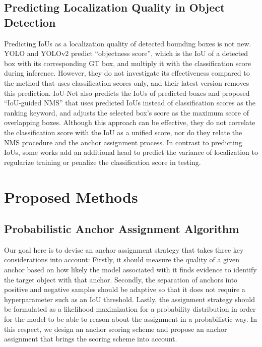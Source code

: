 \documentclass[runningheads]{llncs}
\begin{document}
\subsection{Predicting Localization Quality in Object Detection}
Predicting IoUs as a localization quality of detected bounding boxes is not new. YOLO and YOLOv2\cite{yolo, yolo2} predict ``objectness score'', which is the IoU of a detected box with its corresponding GT box, and multiply it with the classification score during inference. However, they do not investigate its effectiveness compared to the method that uses classification scores only, and their latest version \cite{yolov3} removes this prediction. IoU-Net\cite{iounet} also predicts the IoUs of predicted boxes and proposed ``IoU-guided NMS'' that uses predicted IoUs instead of classification scores as the ranking keyword, and adjusts the selected box's score as the maximum score of overlapping boxes. Although this approach can be effective, they do not correlate the classification score with the IoU as a unified score, nor do they relate the NMS procedure and the anchor assignment process.  In contrast to predicting IoUs, some works\cite{varvoting, gaussyolo} add an additional head to predict the variance of localization to regularize training\cite{varvoting} or penalize the classification score in testing\cite{gaussyolo}.

\section{Proposed Methods}
\subsection{Probabilistic Anchor Assignment Algorithm}
Our goal here is to devise an anchor assignment strategy that takes three key considerations into account: Firstly, it should measure the quality of a given anchor based on how likely the model associated with it finds evidence to identify the target object with that anchor. Secondly, the separation of anchors into positive and negative samples should be adaptive so that it does not require a hyperparameter such as an IoU threshold. Lastly, the assignment strategy should be formulated as a likelihood maximization for a probability distribution in order for the model to be able to reason about the assignment in a probabilistic way. In this respect, we design an anchor scoring scheme and propose an anchor assignment that brings the scoring scheme into account.
\end{document}
